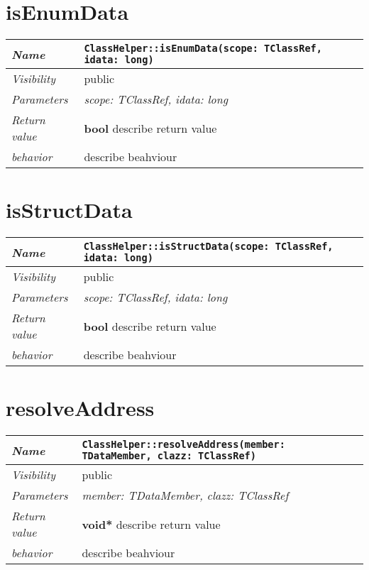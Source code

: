  \section{isEnumData}
\begin{longtable}{p{3cm} @{\hskip 1cm} p{12cm}}
 \hline
\textit{Name} & \texttt{ClassHelper::isEnumData(scope: TClassRef, idata: long)}\\
\hline
 \textit{Visibility} & public\\
\hline
\textit{Parameters} & \textit{scope: TClassRef, idata: long}\\
\hline
\textit{Return value} & \textbf{ bool} describe return value\\
  \hline
 \textit{behavior} & describe beahviour \\
\hline
\end{longtable} \pagebreak
 \section{isStructData}
\begin{longtable}{p{3cm} @{\hskip 1cm} p{12cm}}
 \hline
\textit{Name} & \texttt{ClassHelper::isStructData(scope: TClassRef, idata: long)}\\
\hline
 \textit{Visibility} & public\\
\hline
\textit{Parameters} & \textit{scope: TClassRef, idata: long}\\
\hline
\textit{Return value} & \textbf{ bool} describe return value\\
  \hline
 \textit{behavior} & describe beahviour \\
\hline
\end{longtable} \pagebreak
 \section{resolveAddress}
\begin{longtable}{p{3cm} @{\hskip 1cm} p{12cm}}
 \hline
\textit{Name} & \texttt{ClassHelper::resolveAddress(member: TDataMember, clazz: TClassRef)}\\
\hline
 \textit{Visibility} & public\\
\hline
\textit{Parameters} & \textit{member: TDataMember, clazz: TClassRef}\\
\hline
\textit{Return value} & \textbf{ void*} describe return value\\
  \hline
 \textit{behavior} & describe beahviour \\
\hline
\end{longtable} \pagebreak
 